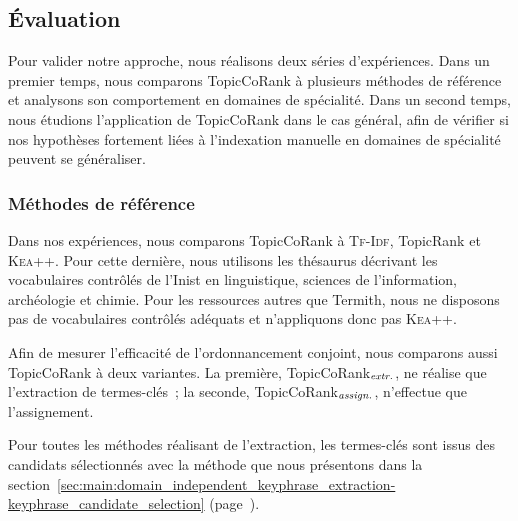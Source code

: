     \subsection{Évaluation}
    \label{subsec:main-domain_specific_keyphrase_annotation-supervised_automatic_keyphrase_annotation-evaluation}
      Pour valider notre approche, nous réalisons deux séries d'expériences.
      Dans un premier temps, nous comparons TopicCoRank à plusieurs méthodes de
      référence et analysons son comportement en domaines de spécialité. Dans
      un second temps, nous étudions l'application de TopicCoRank dans le cas
      général, afin de vérifier si nos hypothèses fortement liées à l'indexation
      manuelle en domaines de spécialité peuvent se généraliser.

      \subsubsection{Méthodes de référence}
      \label{subsubsec:main-domain_specific_keyphrase_annotation-supervised_automatic_keyphrase_annotation-evaluation-baselines}
        Dans nos expériences, nous comparons TopicCoRank à \textsc{Tf-Idf},
        TopicRank et \textsc{Kea++}. Pour cette dernière, nous utilisons les
        thésaurus décrivant les vocabulaires contrôlés de l'Inist en
        linguistique, sciences de l'information, archéologie et chimie. Pour les
        ressources autres que Termith, nous ne disposons pas de vocabulaires
        contrôlés adéquats et n'appliquons donc pas \textsc{Kea++}.

        Afin de mesurer l'efficacité de l'ordonnancement conjoint, nous
        comparons aussi TopicCoRank à deux variantes. La première,
        TopicCoRank$_\textnormal{\textit{extr.}}$, ne réalise que l'extraction
        de termes-clés~; la seconde,
        TopicCoRank$_\textnormal{\textit{assign.}}$, n'effectue que
        l'assignement.

        Pour toutes les méthodes réalisant de l'extraction, les termes-clés sont
        issus des candidats sélectionnés avec la méthode que nous présentons
        dans la
        section~\ref{sec:main:domain_independent_keyphrase_extraction-keyphrase_candidate_selection}
        (page~\pageref{sec:main:domain_independent_keyphrase_extraction-keyphrase_candidate_selection}).

